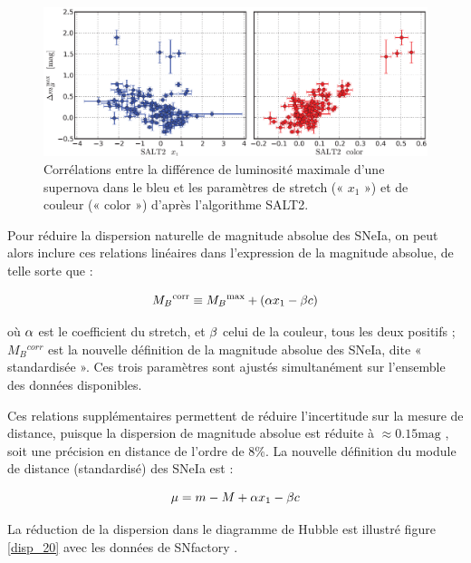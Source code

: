 \documentclass[a4paper, 12pt, svgnames]{article}
\begin{document}
\begin{figure}[htbp!]
    \centering
    \includegraphics[width=.7\linewidth]{Rapport_figures/disp_x1_c.PNG}
    \captionsetup{justification=centering}
    \caption{Corrélations entre la différence de luminosité maximale d'une
    supernova dans le bleu et les paramètres de stretch (« $x_1$ ») et de
couleur (« color ») d'après l'algorithme SALT2.}
    \label{brighter_slower_bluer}
\end{figure}

Pour réduire la dispersion naturelle de magnitude absolue des SNeIa, on peut
alors inclure ces relations linéaires dans l'expression de la magnitude absolue,
de telle sorte que :

\begin{equation}
    M_B{}^{\text{corr}} \equiv M_B{}^{\text{max}} + \left(\alpha x_1 - \beta c\right)
\end{equation}

où $\alpha$ est le coefficient du stretch, et $\beta$ celui de la couleur, tous les
deux positifs ; $M_B{}^{corr}$ est la nouvelle définition de la magnitude
absolue des SNeIa, dite « standardisée ». Ces trois paramètres sont ajustés
simultanément sur l'ensemble des données disponibles.

Ces relations supplémentaires permettent de réduire l'incertitude sur la
mesure de distance, puisque la dispersion de magnitude absolue est réduite à
$\approx 0.15 \mathrm{mag}$ \cite{betoule_improved_2014}, soit une précision en
distance de l'ordre de 8\%. La nouvelle définition du module de distance
(standardisé) des SNeIa est :

\begin{equation}
    \mu = m - M +\alpha x_1 - \beta c
\end{equation}

La réduction de la dispersion dans le diagramme de Hubble est illustré figure
\ref{disp_20} avec les données de SNfactory \cite{rigault_strong_2018}.
\end{document}
